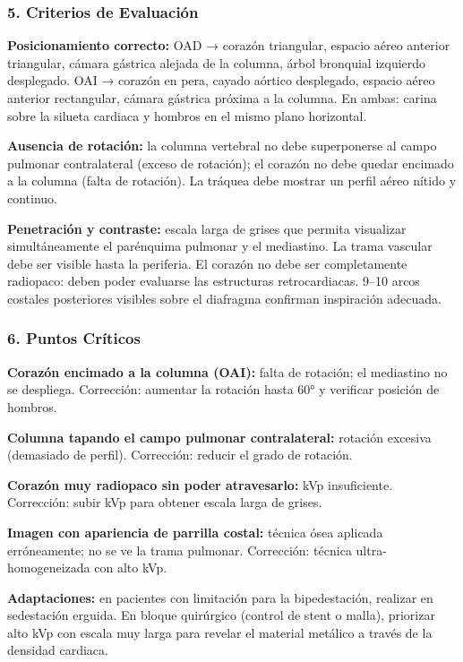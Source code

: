		\subsubsection*{5. Criterios de Evaluación}
		
		\textbf{Posicionamiento correcto:} OAD → corazón triangular, espacio aéreo anterior
		triangular, cámara gástrica alejada de la columna, árbol bronquial izquierdo desplegado.
		OAI → corazón en pera, cayado aórtico desplegado, espacio aéreo anterior rectangular,
		cámara gástrica próxima a la columna. En ambas: carina sobre la silueta cardiaca y hombros
		en el mismo plano horizontal.
		
		\textbf{Ausencia de rotación:} la columna vertebral no debe superponerse al campo pulmonar
		contralateral (exceso de rotación); el corazón no debe quedar encimado a la columna (falta
		de rotación). La tráquea debe mostrar un perfil aéreo nítido y continuo.
		
		\textbf{Penetración y contraste:} escala larga de grises que permita visualizar
		simultáneamente el parénquima pulmonar y el mediastino. La trama vascular debe ser visible
		hasta la periferia. El corazón no debe ser completamente radiopaco: deben poder evaluarse
		las estructuras retrocardiacas. 9--10 arcos costales posteriores visibles sobre el diafragma
		confirman inspiración adecuada.
		
		\subsubsection*{6. Puntos Críticos}
		
		\textbf{Corazón encimado a la columna (OAI):} falta de rotación; el mediastino no se despliega.
		Corrección: aumentar la rotación hasta 60° y verificar posición de hombros.
		
		\textbf{Columna tapando el campo pulmonar contralateral:} rotación excesiva (demasiado de
		perfil). Corrección: reducir el grado de rotación.
		
		\textbf{Corazón muy radiopaco sin poder atravesarlo:} kVp insuficiente. Corrección: subir kVp
		para obtener escala larga de grises.
		
		\textbf{Imagen con apariencia de parrilla costal:} técnica ósea aplicada erróneamente;
		no se ve la trama pulmonar. Corrección: técnica ultra-homogeneizada con alto kVp.
		
		\textbf{Adaptaciones:} en pacientes con limitación para la bipedestación, realizar en
		sedestación erguida. En bloque quirúrgico (control de stent o malla), priorizar alto kVp
		con escala muy larga para revelar el material metálico a través de la densidad cardiaca.
		
